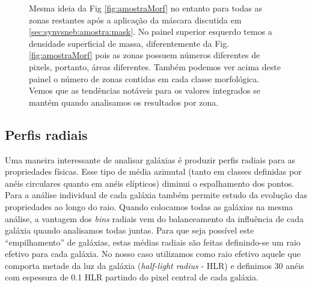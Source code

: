 \begin{figure}
	\centering
	\caption[Classificação por morfologia após máscara.]
	{Mesma ideia da Fig \ref{fig:amostraMorf} no entanto para todas as zonas restantes após a
	aplicação da máscara discutida em \ref{sec:synvsneb:amostra:mask}. No painel superior esquerdo
	temos a densidade superficial de massa, diferentemente da Fig. \ref{fig:amostraMorf} pois as zonas
	possuem números diferentes de pixels, portanto, áreas diferentes. Também podemos ver acima deste
	painel o número de zonas contidas em cada classe morfológica. Vemos que as tendências notáveis para
	os valores integrados se mantém quando analisamos os resultados por zona.}
	\label{fig:amostraRealMorf}
\end{figure}

\subsection{Perfis radiais}
\label{sec:synvsneb:amostra:rad}

Uma maneira interessante de analisar galáxias é produzir perfis radiais para as propriedades
físicas. Esse tipo de média azimutal (tanto em classes definidas por anéis circulares quanto em
anéis elípticos) diminui o espalhamento dos pontos. Para a análise individual de cada galáxia também
permite estudo da evolução das propriedades ao longo do raio. Quando colocamos todas as galáxias na
mesma análise, a vantagem dos {\em bins} radiais vem do balanceamento da influência de cada galáxia
quando analisamos todas juntas. Para que seja possível este ``empilhamento'' de galáxias, estas
médias radiais são feitas definindo-se um raio efetivo para cada galáxia. No nosso caso utilizamos
como raio efetivo aquele que comporta metade da luz da galáxia ({\em half-light radius} - HLR) e
definimos 30 anéis com espessura de 0.1 HLR partindo do pixel central de cada galáxia. 

